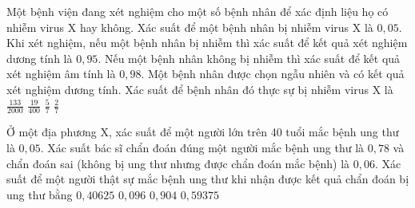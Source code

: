 \begin{ex}%
    Một bệnh viện đang xét nghiệm cho một số bệnh nhân để xác định liệu họ có nhiễm virus X hay không. Xác suất để một bệnh nhân bị nhiễm virus X là $0,05$. Khi xét nghiệm, nếu một bệnh nhân bị nhiễm thì xác suất để kết quả xét nghiệm dương tính là $0,95$. Nếu một bệnh nhân không bị nhiễm thì xác suất để kết quả xét nghiệm âm tính là $0,98$. Một bệnh nhân được chọn ngẫu nhiên và có kết quả xét nghiệm dương tính. Xác suất để bệnh nhân đó thực sự bị nhiễm virus X là
    \choice
    {$\frac{133}{2000}$}
    {$\frac{19}{400}$}
    {\True $\frac{5}{7}$}
    {$\frac{2}{7}$}
\end{ex}
\begin{ex}%
    Ở một địa phương X, xác suất để một người lớn trên 40 tuổi mắc bệnh ung thư là $0,05$. Xác suất bác sĩ chẩn đoán đúng một người mắc bệnh ung thư là $0,78$ và chẩn đoán sai (không bị ung thư nhưng được chẩn đoán mắc bệnh) là $0,06$. Xác suất để một người thật sự mắc bệnh ung thư khi nhận được kết quả chẩn đoán bị ung thư bằng
    \choice
    {\True $0,40625$}
    {$0,096$}
    {$0,904$}
    {$0,59375$}
\end{ex}
